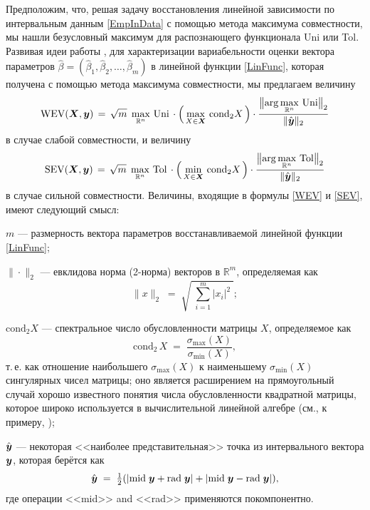 \documentclass[a5paper,openany]{book}
\newcommand{\mbf}[1]{\protect\text{\boldmath$#1$}}
\newcommand{\mbb}{\mathbb}
\newcommand{\m}{\mathrm{mid}\;}
\newcommand{\Uni}{\mathrm{Uni}\,}
\newcommand{\Tol}{\mathrm{Tol}\,}
\newcommand{\cond}{\mathrm{cond}}
\renewcommand{\r}{\mathrm{rad}\;}
\begin{document}
Предположим, что, решая задачу восстановления линейной зависимости по интервальным 
данным \eqref{EmpInData} с помощью метода максимума совместности, мы нашли безусловный 
максимум для распознающего функционала Uni или Tol. Развивая идеи работы \cite{SShary2019}, 
для характеризации вариабельности оценки вектора параметров $\hat{\beta} = (\hat{\beta}_{1}, 
\hat{\beta}_{2}, \ldots, \hat{\beta}_{m})$ в линейной функции \eqref{LinFunc}, которая 
получена с помощью метода максимума совместности, мы предлагаем 
величину 
\begin{equation}
\label{WEV}
\mbox{WEV}(\mbf{X}, \mbf{y})\, = \,\sqrt{m}\;\max_{\mbb{R}^n}\,\Uni 
   \cdot \Bigl(\,\max_{X\in\mbf{X}}\,\cond_{2} X\,\Bigr) \cdot 
   \frac{\displaystyle\bigl\|\arg\max_{\mbb{R}^n}\,
   \Uni\!\bigr\|_{2}}{\|\hat{\mbf{y}}\|_2} 
\end{equation} 
в случае слабой совместности, и величину 
\begin{equation}
\label{SEV}
\mbox{SEV}(\mbf{X}, \mbf{y})\, = \,\sqrt{m}\;\max_{\mbb{R}^n}\,\Tol 
   \cdot \Bigl(\,\min_{X\in\mbf{X}}\,\cond_{2} X\,\Bigr) \cdot 
   \frac{\displaystyle\bigl\|\arg\max_{\mbb{R}^n}\,
   \Tol\!\bigr\|_{2}}{\|\hat{\mbf{y}}\|_2} 
\end{equation} 
в случае сильной совместности. Величины, входящие в формулы \eqref{WEV} и \eqref{SEV}, 
имеют следующий смысл: 
\begin{description} 
\item 
$m$ --- размерность вектора параметров восстанавливаемой линейной функции \eqref{LinFunc}; 
\item 
$\|\cdot\|_2$ --- евклидова норма (2-норма) векторов в $\mbb{R}^m$, определяемая как 
\begin{equation*} 
\|x\|_2 \; = \; \sqrt{\;\sum_{i=1}^m |x_{i}|^{2}\;}; 
\end{equation*} 
\item 
$\cond_{2}X$ --- спектральное число обусловленности матрицы $X$, определяемое как 
\begin{equation*} 
\cond_{2}\,X\;  = \; \frac{\sigma_{\max}(X)}{\sigma_{\min}(X)}, 
\end{equation*} 
т.\,е. как отношение наибольшего $\sigma_{\max}(X)$ к наименьшему $\sigma_{\min}(X)$ 
сингулярных чисел матрицы; оно является расширением на прямоугольный случай хорошо 
известного понятия числа обусловленности квадратной матрицы, которое широко используется 
в вычислительной линейной алгебре (см., к примеру, \cite{GolubVanLoan,Watkins}); 
\item 
$\hat{\mbf{y}}$ --- некоторая <<наиболее представительная>> точка из интервального 
вектора $\mbf{y}$, которая берётся как 
\begin{equation} 
\label{hatyFormula}
\hat{\mbf{y}}\; = \;\tfrac{1}{2}(|\m\mbf{y} + \r\mbf{y}| + |\m\mbf{y} - \r\mbf{y}|), 
\end{equation} 
где операции <<mid>> and <<rad>> применяются покомпонентно. 
\end{description} 
   
\end{document}
